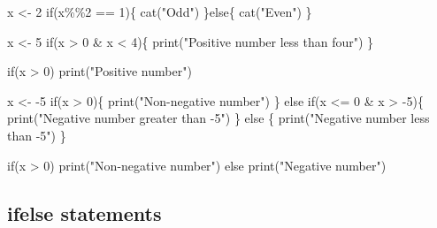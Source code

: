 \documentclass[
  a4paper,
]{book}
\newenvironment{Shaded}{\begin{snugshade}}{\end{snugshade}}
\newcommand{\ControlFlowTok}[1]{\textcolor[rgb]{0.00,0.23,0.31}{#1}}
\newcommand{\DecValTok}[1]{\textcolor[rgb]{0.68,0.00,0.00}{#1}}
\newcommand{\FunctionTok}[1]{\textcolor[rgb]{0.28,0.35,0.67}{#1}}
\newcommand{\NormalTok}[1]{\textcolor[rgb]{0.00,0.23,0.31}{#1}}
\newcommand{\OtherTok}[1]{\textcolor[rgb]{0.00,0.23,0.31}{#1}}
\newcommand{\SpecialCharTok}[1]{\textcolor[rgb]{0.37,0.37,0.37}{#1}}
\newcommand{\StringTok}[1]{\textcolor[rgb]{0.13,0.47,0.30}{#1}}
\begin{document}
\begin{Shaded}
\begin{Highlighting}[]
\NormalTok{x }\OtherTok{\textless{}{-}} \DecValTok{2}
\ControlFlowTok{if}\NormalTok{(x}\SpecialCharTok{\%\%}\DecValTok{2} \SpecialCharTok{==} \DecValTok{1}\NormalTok{)\{}
  \FunctionTok{cat}\NormalTok{(}\StringTok{"Odd"}\NormalTok{)}
\NormalTok{\}}\ControlFlowTok{else}\NormalTok{\{}
  \FunctionTok{cat}\NormalTok{(}\StringTok{"Even"}\NormalTok{)}
\NormalTok{\} }

\NormalTok{x }\OtherTok{\textless{}{-}} \DecValTok{5}
\ControlFlowTok{if}\NormalTok{(x }\SpecialCharTok{\textgreater{}} \DecValTok{0} \SpecialCharTok{\&}\NormalTok{ x }\SpecialCharTok{\textless{}} \DecValTok{4}\NormalTok{)\{}
  \FunctionTok{print}\NormalTok{(}\StringTok{"Positive number less than four"}\NormalTok{)}
\NormalTok{\}}

\ControlFlowTok{if}\NormalTok{(x }\SpecialCharTok{\textgreater{}} \DecValTok{0}\NormalTok{) }\FunctionTok{print}\NormalTok{(}\StringTok{"Positive number"}\NormalTok{)}

\NormalTok{x }\OtherTok{\textless{}{-}} \SpecialCharTok{{-}}\DecValTok{5}
\ControlFlowTok{if}\NormalTok{(x }\SpecialCharTok{\textgreater{}} \DecValTok{0}\NormalTok{)\{}
  \FunctionTok{print}\NormalTok{(}\StringTok{"Non{-}negative number"}\NormalTok{)}
\NormalTok{\} }\ControlFlowTok{else} \ControlFlowTok{if}\NormalTok{(x }\SpecialCharTok{\textless{}=} \DecValTok{0} \SpecialCharTok{\&}\NormalTok{ x }\SpecialCharTok{\textgreater{}} \SpecialCharTok{{-}}\DecValTok{5}\NormalTok{)\{}
  \FunctionTok{print}\NormalTok{(}\StringTok{"Negative number greater than {-}5"}\NormalTok{)}
\NormalTok{\} }\ControlFlowTok{else}\NormalTok{ \{}
  \FunctionTok{print}\NormalTok{(}\StringTok{"Negative number less than {-}5"}\NormalTok{)}
\NormalTok{\}}

\ControlFlowTok{if}\NormalTok{(x }\SpecialCharTok{\textgreater{}} \DecValTok{0}\NormalTok{)}
  \FunctionTok{print}\NormalTok{(}\StringTok{"Non{-}negative number"}\NormalTok{)}
\ControlFlowTok{else}
  \FunctionTok{print}\NormalTok{(}\StringTok{"Negative number"}\NormalTok{)}
\end{Highlighting}
\end{Shaded}

\hypertarget{ifelse-statements}{%
\subsection{ifelse statements}\label{ifelse-statements}}
\end{document}
